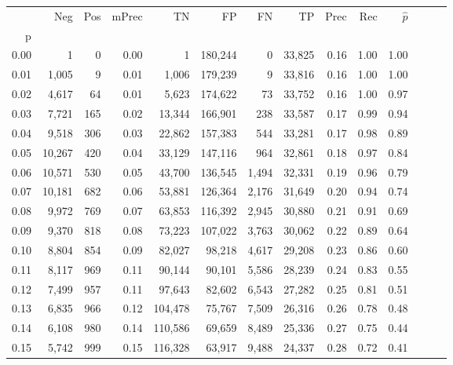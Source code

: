 \begin{tabular}{rrrrrrrrrrrrrr}
\toprule
{} &     Neg &  Pos & mPrec &       TN &       FP &      FN &      TP &  Prec &   Rec & $\hat{p}$ \\
p    &         &      &       &          &          &         &         &       &       &           \\
\midrule
0.00 &       1 &    0 &  0.00 &        1 &  180,244 &       0 &  33,825 &  0.16 &  1.00 &      1.00 \\
0.01 &   1,005 &    9 &  0.01 &    1,006 &  179,239 &       9 &  33,816 &  0.16 &  1.00 &      1.00 \\
0.02 &   4,617 &   64 &  0.01 &    5,623 &  174,622 &      73 &  33,752 &  0.16 &  1.00 &      0.97 \\
0.03 &   7,721 &  165 &  0.02 &   13,344 &  166,901 &     238 &  33,587 &  0.17 &  0.99 &      0.94 \\
0.04 &   9,518 &  306 &  0.03 &   22,862 &  157,383 &     544 &  33,281 &  0.17 &  0.98 &      0.89 \\
0.05 &  10,267 &  420 &  0.04 &   33,129 &  147,116 &     964 &  32,861 &  0.18 &  0.97 &      0.84 \\
0.06 &  10,571 &  530 &  0.05 &   43,700 &  136,545 &   1,494 &  32,331 &  0.19 &  0.96 &      0.79 \\
0.07 &  10,181 &  682 &  0.06 &   53,881 &  126,364 &   2,176 &  31,649 &  0.20 &  0.94 &      0.74 \\
0.08 &   9,972 &  769 &  0.07 &   63,853 &  116,392 &   2,945 &  30,880 &  0.21 &  0.91 &      0.69 \\
0.09 &   9,370 &  818 &  0.08 &   73,223 &  107,022 &   3,763 &  30,062 &  0.22 &  0.89 &      0.64 \\
0.10 &   8,804 &  854 &  0.09 &   82,027 &   98,218 &   4,617 &  29,208 &  0.23 &  0.86 &      0.60 \\
0.11 &   8,117 &  969 &  0.11 &   90,144 &   90,101 &   5,586 &  28,239 &  0.24 &  0.83 &      0.55 \\
0.12 &   7,499 &  957 &  0.11 &   97,643 &   82,602 &   6,543 &  27,282 &  0.25 &  0.81 &      0.51 \\
0.13 &   6,835 &  966 &  0.12 &  104,478 &   75,767 &   7,509 &  26,316 &  0.26 &  0.78 &      0.48 \\
0.14 &   6,108 &  980 &  0.14 &  110,586 &   69,659 &   8,489 &  25,336 &  0.27 &  0.75 &      0.44 \\
0.15 &   5,742 &  999 &  0.15 &  116,328 &   63,917 &   9,488 &  24,337 &  0.28 &  0.72 &      0.41 \\

\end{tabular}
